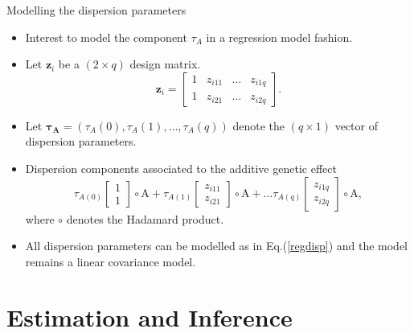 \documentclass[
  ignorenonframetext,
  serif,
  professionalfont,
  usenames,
  dvipsnames,
  aspectratio = 169]{beamer}
\providecommand{\tightlist}{%
  \setlength{\itemsep}{0pt}\setlength{\parskip}{0pt}}
\renewcommand{\tightlist}{%
  \setlength{\itemsep}{0\baselineskip}
  \setlength{\parskip}{0.25\baselineskip}
}
\begin{document}
\begin{frame}{Modelling the dispersion parameters}
\protect\hypertarget{modelling-the-dispersion-parameters}{}
\begin{itemize}
\tightlist
\item
  Interest to model the component \(\tau_A\) in a regression model
  fashion.
\item
  Let \(\boldsymbol{z}_i\) be a \((2 \times q)\) design matrix.
  \begin{equation*}
  \boldsymbol{z}_i = \begin{bmatrix}
  1 & z_{i11} & \ldots & z_{i1q} \\ 
  1 & z_{i21} & \ldots & z_{i2q}
  \end{bmatrix}.
  \end{equation*}
\item
  Let
  \(\boldsymbol{\tau_A} = (\tau_A(0), \tau_A(1), \ldots, \tau_A(q))\)
  denote the \((q \times 1)\) vector of dispersion parameters.
\item
  Dispersion components associated to the additive genetic effect
  \begin{equation}
  \label{regdisp}
  \tau_{A(0)}
  \begin{bmatrix}
  1\\ 
  1
  \end{bmatrix} \circ \mathrm{A} + 
  \tau_{A(1)} 
  \begin{bmatrix}
  z_{i11}\\ 
  z_{i21}
  \end{bmatrix} \circ \mathrm{A} + \ldots 
  \tau_{A(q)} 
  \begin{bmatrix}
  z_{i1q}\\ 
  z_{i2q}
  \end{bmatrix} \circ \mathrm{A},
  \end{equation} where \(\circ\) denotes the Hadamard product.
\item
  All dispersion parameters can be modelled as in Eq.(\ref{regdisp}) and
  the model remains a linear covariance model.
\end{itemize}
\end{frame}

\hypertarget{estimation-and-inference}{%
\section{Estimation and Inference}\label{estimation-and-inference}}
\end{document}
